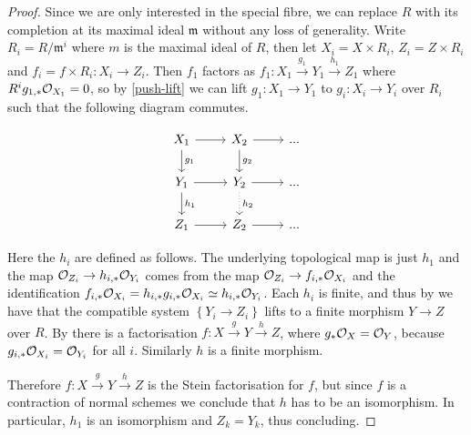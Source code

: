 \begin{proof}
	Since we are only interested in the special fibre, we can replace $R$ with its completion at its maximal ideal $\mathfrak{m}$ without any loss of generality.
	Write $R_{i}=R/\mathfrak{m}^{i}$ where $m$ is the maximal ideal of $R$, then let $X_{i}=X \times R_{i}$, $Z_{i}=Z\times R_{i}$ and $f_{i}=f\times R_{i}\colon X_{i} \to Z_{i}$.
	Then $f_{1}$ factors as $f_{1}\colon X_{1} \xrightarrow{g_{1}} Y_{1} \xrightarrow{h_{1}} Z_{1}$ where $R^{i}g_{1,*}\ox[X_{1}]=0$, so by \autoref{push-lift} we can lift $g_{1}\colon X_{1} \to Y_{1}$ to $g_{i}\colon X_{i} \to Y_{i}$ over $R_{i}$ such that the following diagram commutes.
	
	\[\begin{tikzcd}
	X_{1} \arrow[r] \arrow[d, "g_{1}"] & X_{2} \arrow[r] \arrow[d, "g_{2}"] & ... \\
	Y_{1} \arrow[r] \arrow[d, "h_{1}"] & Y_{2} \arrow[d, dotted, "h_{2}"] \arrow[r]  & ... \\
	Z_{1} \arrow[r]                    & Z_{2} \arrow[r]                    & ...
	\end{tikzcd}\]
	
	Here the $h_{i}$ are defined as follows. The underlying topological map is just $h_{1}$ and the map $\ox[Z_{i}] \to h_{i,*}\ox[Y_{i}]$ comes from the map ${\ox[Z_{i}] \to f_{i,*}\ox[X_{i}]}$ and the identification $f_{i,*}\ox[X_{i}]=h_{i,*}g_{i,*}\ox[X_{i}]\simeq h_{i,*}\ox[Y_{i}]$.
	Each $h_{i}$ is finite, and thus by
	\cite[\href{https://stacks.math.columbia.edu/tag/09ZT}{Tag 09ZT}]{stacks-project} we have that the compatible system $\left\{Y_{i} \to Z_i \right\}$ lifts to a finite morphism $Y \to Z$ over $R$. By \cite[\href{https://stacks.math.columbia.edu/tag/0A42}{Tag 0A42}]{stacks-project} there is a factorisation ${f\colon X \xrightarrow{g} Y \xrightarrow{h} Z}$, where $g_{*}\ox = \cO_Y$, because $g_{i,*}\cO_{X_i}=\cO_{Y_i}$ for all $i$. Similarly $h$ is a finite morphism. 
	
	Therefore $f \colon X \xrightarrow{g} Y \xrightarrow{h} Z$ is the Stein factorisation for $f$, but since $f$ is a contraction of normal schemes we conclude that $h$ has to be an isomorphism.
	In particular, $h_1$ is an isomorphism and $Z_{k}=Y_{k}$, thus concluding.
\end{proof}

